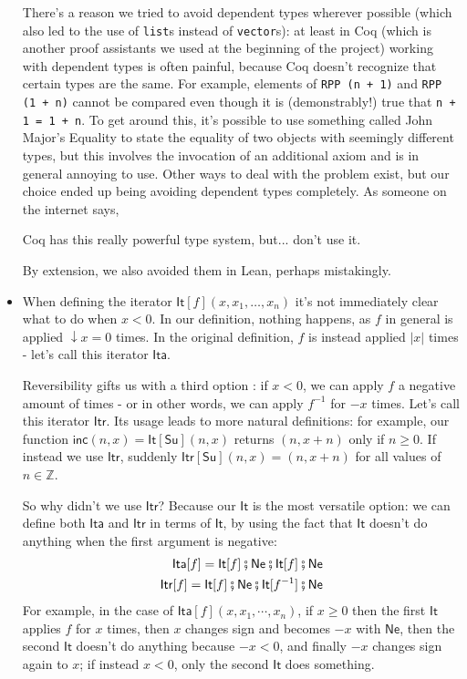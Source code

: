 \documentclass[oneside]{book}
\theoremstyle{definition}
\theoremstyle{remark}
\theoremstyle{plain}
\newcommand{\ZZ}{\mathbb{Z}}
\newcommand{\rppNe}{\mathsf{Ne}}
\newcommand{\rppSu}{\mathsf{Su}}
\newcommand{\rppCo}{\fatsemi}
\newcommand{\rppIt}{\mathsf{It}}
\newcommand{\rppIta}{\mathsf{Ita}}
\newcommand{\rppItr}{\mathsf{Itr}}
\newcommand{\rppinc}{\mathsf{inc}}
\begin{document}
\begin{itemize}
There's a reason we tried to avoid dependent types wherever possible
(which also led to the use of \lstinline{list}s instead of \lstinline{vector}s):
at least in Coq (which is another proof assistants we used at the beginning of the project)
working with dependent types is often painful, because Coq doesn't recognize that certain types are the same.
For example, elements of \lstinline{RPP (n + 1)} and \lstinline{RPP (1 + n)} cannot be compared even though it is (demonstrably!) true that
\lstinline{n + 1 = 1 + n}. To get around this, it's possible to use something called John Major's Equality \cite{cpdtbook}
to state the equality of two objects with seemingly different types,
but this involves the invocation of an additional axiom and is in general annoying to use.
Other ways to deal with the problem exist,
but our choice ended up being avoiding dependent types completely.
As someone on the internet says,
\begin{displayquote}
Coq has this really powerful type system, but... don't use it. \cite{dougdad}
\end{displayquote}
By extension, we also avoided them in Lean, perhaps mistakingly.
\item When defining the iterator $\rppIt[f] (x, x_1, \dots, x_n)$ it's not immediately clear what to do when $x < 0$.
In our definition, nothing happens, as $f$ in general is applied $\downarrow x = 0$ times.
In the original definition, $f$ is instead applied $| x |$ times - let's call this iterator $\rppIta$.

Reversibility gifts us with a third option \cite{matos03tcs}: if $x < 0$,
we can apply $f$ a negative amount of times - or in other words, we can apply $f^{-1}$ for $- x$ times.
Let's call this iterator $\rppItr$.
Its usage leads to more natural definitions:
for example, our function $\rppinc (n, x) = \rppIt[\rppSu] (n, x)$ returns $(n, x+n)$ only if $n \ge 0$.
If instead we use $\rppItr$, suddenly $\rppItr[\rppSu] (n, x) = (n, x + n)$ for all values of $n \in \ZZ$.

So why didn't we use $\rppItr$?
Because our $\rppIt$ is the most versatile option:
we can define both $\rppIta$ and $\rppItr$ in terms of $\rppIt$,
by using the fact that $\rppIt$ doesn't do anything when the first argument is negative:
\begin{align*}
  \rppIta[f] = \rppIt[f] \rppCo \rppNe \rppCo \rppIt[f] \rppCo \rppNe \\
  \rppItr[f] = \rppIt[f] \rppCo \rppNe \rppCo \rppIt[f^{-1}] \rppCo \rppNe
\end{align*}
For example, in the case of $\rppIta[f](x,x_1,\cdots,x_n)$, if $x \ge 0$ then the first $\rppIt$ applies $f$ for $x$ times,
then $x$ changes sign and becomes $-x$ with $\rppNe$, then the second $\rppIt$ doesn't do anything because $- x < 0$,
and finally $-x$ changes sign again to $x$; if instead $x < 0$, only the second $\rppIt$ does something.


\end{itemize}
\end{document}
